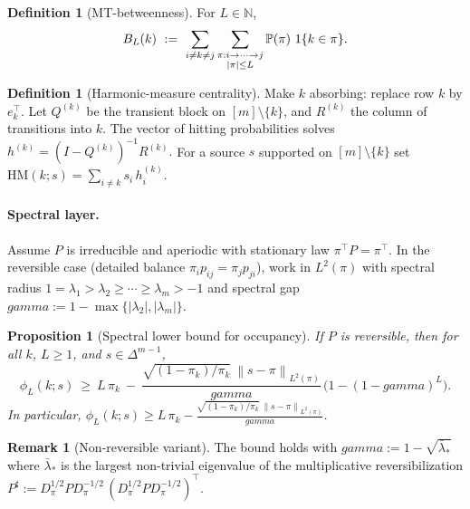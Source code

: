 \documentclass[11pt]{article}
\def\sgap{gamma}%
\newcommand{\PP}{\mathbb P}
\newcommand{\1}{\mathbbm{1}}
\newcommand{\norm}[1]{\left\lVert #1 \right\rVert}
\newcommand{\sgap}{\gamma}
\theoremstyle{plain}
\newtheorem{proposition}[theorem]{Proposition}
\theoremstyle{definition}
\newtheorem{definition}[theorem]{Definition}
\newtheorem{remark}[theorem]{Remark}
\begin{document}
\begin{definition}[MT-betweenness]
\label{def:mtb}
For $L\in\mathbb N$,
\begin{equation}
B_L(k)\ :=\ \sum_{i\neq k\neq j}
\sum_{\substack{\pi: i\to\cdots\to j\\ |\pi|\le L}} \PP(\pi)\ \1\{k\in \pi\}.
\end{equation}
\end{definition}

\begin{definition}[Harmonic-measure centrality]
\label{def:hm}
Make $k$ absorbing: replace row $k$ by $e_k^\top$. Let $Q^{(k)}$ be the transient block on $[m]\setminus\{k\}$, and $R^{(k)}$ the column of transitions into $k$. The vector of hitting probabilities solves
\(
h^{(k)}=(I-Q^{(k)})^{-1} R^{(k)}.
\)
For a source $s$ supported on $[m]\setminus\{k\}$ set
\(
\mathrm{HM}(k;s)=\sum_{i\ne k} s_i\, h^{(k)}_i.
\)
\end{definition}

\paragraph{Spectral layer.}
Assume $P$ is irreducible and aperiodic with stationary law $\pi^\top P=\pi^\top$. In the reversible case (detailed balance $\pi_i p_{ij}=\pi_j p_{ji}$), work in $L^2(\pi)$ with spectral radius $1=\lambda_1>\lambda_2\ge\cdots\ge \lambda_m>-1$ and spectral gap $\sgap:=1-\max\{|\lambda_2|,|\lambda_m|\}$.

\begin{proposition}[Spectral lower bound for occupancy]
\label{prop:phiL-lb}
If $P$ is reversible, then for all $k$, $L\ge1$, and $s\in\Delta^{m-1}$,
\begin{equation}
\label{eq:phiL-lb}
\phi_L(k;s)\ \ge\ L\,\pi_k\ -\ \frac{\sqrt{(1-\pi_k)/\pi_k}\ \norm{s-\pi}_{L^2(\pi)}}{\sgap}\,\big(1-(1-\sgap)^L\big).
\end{equation}
In particular, $\phi_L(k;s)\ge L\,\pi_k - \frac{\sqrt{(1-\pi_k)/\pi_k}\ \norm{s-\pi}_{L^2(\pi)}}{\sgap}$.
\end{proposition}

\begin{remark}[Non-reversible variant]
The bound holds with $\sgap:=1-\sqrt{\bar\lambda_\ast}$ where $\bar\lambda_\ast$ is the largest non-trivial eigenvalue of the multiplicative reversibilization $P^\sharp:=D_\pi^{1/2} P D_\pi^{-1/2}\,(D_\pi^{1/2} P D_\pi^{-1/2})^\top$.
\end{remark}
\end{document}
